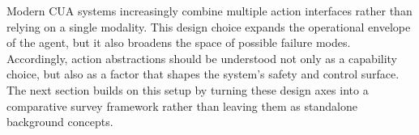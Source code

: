 Modern CUA systems increasingly combine multiple action interfaces rather than relying on a single modality. This design choice expands the operational envelope of the agent, but it also broadens the space of possible failure modes. Accordingly, action abstractions should be understood not only as a capability choice, but also as a factor that shapes the system's safety and control surface. The next section builds on this setup by turning these design axes into a comparative survey framework rather than leaving them as standalone background concepts.
